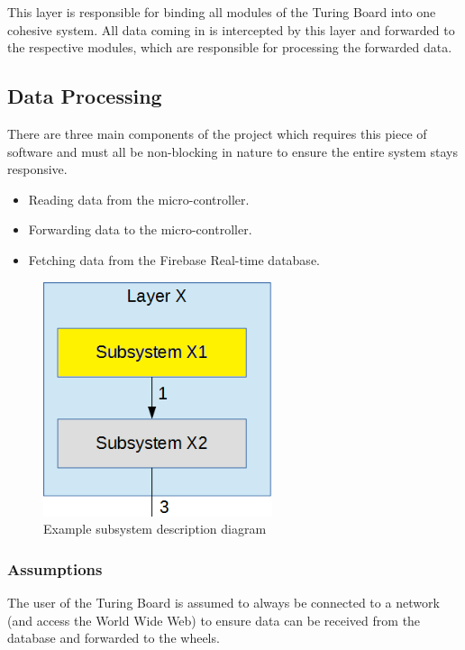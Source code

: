 This layer is responsible for binding all modules of the Turing Board into one cohesive system. All data coming in is intercepted by this layer and forwarded to the respective modules, which are responsible for processing the forwarded data.

\subsection{Data Processing}
There are three main components of the project which requires this piece of software and must all be non-blocking in nature to ensure the entire system stays responsive.
\begin{itemize}
    \item Reading data from the micro-controller.
    \item Forwarding data to the micro-controller.
    \item Fetching data from the Firebase Real-time database.
\end{itemize}

\begin{figure}[h!]
	\centering
 	\includegraphics[width=0.60\textwidth]{images/subsystem}
 \caption{Example subsystem description diagram}
\end{figure}

\subsubsection{Assumptions}
The user of the Turing Board is assumed to always be connected to a network (and access the World Wide Web) to ensure data can be received from the database and forwarded to the wheels.

